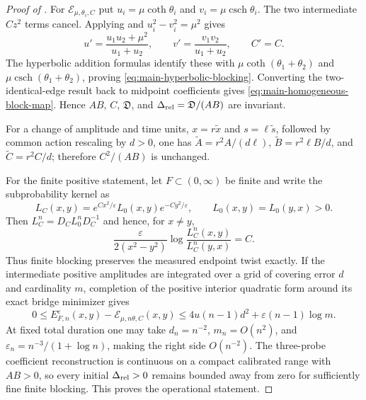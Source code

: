 \documentclass[11pt]{article}
\theoremstyle{definition}
\theoremstyle{remark}
\begin{document}
\begin{proof}[Proof of ]
For $\mathcal E_{\mu,\theta_i,C}$ put
$u_i=\mu\coth\theta_i$ and $v_i=\mu\operatorname{csch}\theta_i$.
The two intermediate $Cz^2$ terms cancel.  Applying
 and $u_i^2-v_i^2=\mu^2$ gives
\begin{equation}
 u'=\frac{u_1u_2+\mu^2}{u_1+u_2},\qquad
 v'=\frac{v_1v_2}{u_1+u_2},\qquad C'=C.
\end{equation}
The hyperbolic addition formulas identify these with
$\mu\coth(\theta_1+\theta_2)$ and
$\mu\operatorname{csch}(\theta_1+\theta_2)$, proving
\eqref{eq:main-hyperbolic-blocking}.  Converting the two-identical-edge result
back to midpoint coefficients gives \eqref{eq:main-homogeneous-block-map}.
Hence $AB$, $C$, $\mathfrak D$, and
$\Delta_{\rm rel}=\mathfrak D/(AB)$ are invariant.

For a change of amplitude and time units, $x=r\widetilde x$ and
$s=\ell\widetilde s$, followed by common action rescaling by $d>0$, one has
$\widetilde A=r^2A/(d\ell)$,
$\widetilde B=r^2\ell B/d$, and $\widetilde C=r^2C/d$; therefore
$C^2/(AB)$ is unchanged.

For the finite positive statement, let $F\subset(0,\infty)$ be finite and
write the subprobability kernel as
\begin{equation}
 L_C(x,y)=e^{Cx^2/\varepsilon}L_0(x,y)e^{-Cy^2/\varepsilon},
 \qquad L_0(x,y)=L_0(y,x)>0.
 \label{eq:supp-finite-twist-similarity}
\end{equation}
Then $L_C^n=D_CL_0^nD_C^{-1}$ and hence, for $x\ne y$,
\begin{equation}
 \boxed{\frac{\varepsilon}{2(x^2-y^2)}
 \log\frac{L_C^n(x,y)}{L_C^n(y,x)}=C.}
 \label{eq:supp-finite-twist-read}
\end{equation}
Thus finite blocking preserves the measured endpoint twist exactly.  If the
intermediate positive amplitudes are integrated over a grid of covering error
$d$ and cardinality $m$, completion of the positive interior quadratic form
around its exact bridge minimizer gives
\begin{equation}
 0\le E_{F,n}^{\varepsilon}(x,y)-
 \mathcal E_{\mu,n\theta,C}(x,y)
 \le4u(n-1)d^2+\varepsilon(n-1)\log m.
 \label{eq:supp-finite-block-error}
\end{equation}
At fixed total duration one may take $d_n=n^{-2}$,
$m_n=O(n^2)$, and $\varepsilon_n=n^{-3}/(1+\log n)$, making the right side
$O(n^{-2})$.  The three-probe coefficient reconstruction is continuous on a
compact calibrated range with $AB>0$, so every initial
$\Delta_{\rm rel}>0$ remains bounded away from zero for sufficiently fine
finite blocking.  This proves the operational statement.
\end{proof}
\end{document}
